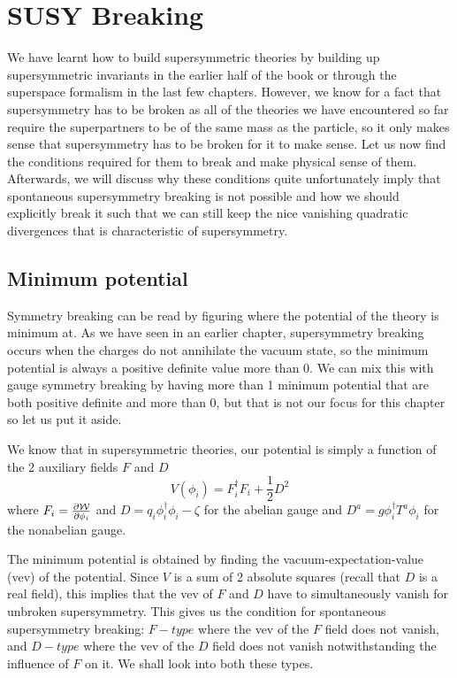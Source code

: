 \chapter{SUSY Breaking}
\label{ch:14}

We have learnt how to build supersymmetric theories by building up supersymmetric invariants in the earlier half of the book or through the superspace formalism in the last few chapters. However, we know for a fact that supersymmetry has to be broken as all of the theories we have encountered so far require the superpartners to be of the same mass as the particle, so it only makes sense that supersymmetry has to be broken for it to make sense. Let us now find the conditions required for them to break and make physical sense of them. Afterwards, we will discuss why these conditions quite unfortunately imply that spontaneous supersymmetry breaking is not possible and how we should explicitly break it such that we can still keep the nice vanishing quadratic divergences that is characteristic of supersymmetry.

\section{Minimum potential}
\label{ch:14:minimum potential}
Symmetry breaking can be read by figuring where the potential of the theory is minimum at. As we have seen in an earlier chapter, supersymmetry breaking occurs when the charges do not annihilate the vacuum state, so the minimum potential is always a positive definite value more than $0$. We can mix this with gauge symmetry breaking by having more than 1 minimum potential that are both positive definite and more than $0$, but that is not our focus for this chapter so let us put it aside.

We know that in supersymmetric theories, our potential is simply a function of the 2 auxiliary fields $F$ and $D$
\begin{equation}
    V(\phi_i) = F_i^\dagger F_i + \frac{1}{2} D^2
\end{equation}
where $F_i = \frac{\partial {\mathcal{W}}}{\partial {\phi_i}}$ and $D = q_i\phi_i^\dagger \phi_i - \zeta $ for the abelian gauge and $D^a = g\phi_i^\dagger T^a \phi_i$ for the nonabelian gauge.

The minimum potential is obtained by finding the vacuum-expectation-value (vev) of the potential. Since $V$ is a sum of 2 absolute squares (recall that $D$ is a real field), this implies that the vev of $F$ and $D$ have to simultaneously vanish for unbroken supersymmetry. This gives us the condition for spontaneous supersymmetry breaking: $F-type$ where the vev of the $F$ field does not vanish, and $D-type$ where the vev of the $D$ field does not vanish notwithstanding the influence of $F$ on it. We shall look into both these types.

